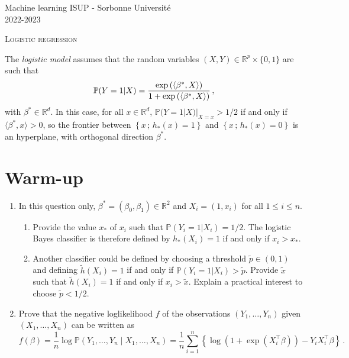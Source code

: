 \documentclass[a4paper,10pt,fleqn]{article}
\newcommand{\eqsp}{\,}
\newcommand{\rset}{\ensuremath{\mathbb{R}}}
\newcommand{\bP}{\mathbb{P}}
\newcommand{\1}{\ensuremath{\mathbbm{1}}}
\begin{document}
\noindent Machine learning \hfill ISUP - Sorbonne Universit\'e \\
 2022-2023

\noindent\hrulefill

\begin{center}
\textsc{Logistic regression}
\end{center}
\hrulefill

\medskip





The \emph{logistic model} assumes that the random variables  $(X,Y)\in \rset^p\times\{0,1\}$ are such that
$$
\bP(Y=1|X)={\exp\left(\langle \beta^*,X\rangle\right)\over 1+\exp\left(\langle \beta^*,X\rangle\right)}\eqsp,
$$
with $\beta^*\in\mathbb{R}^d$. In this case, for all $x\in\rset^d$, $\bP(Y=1|X)|_{X=x}>1/2$ if and only if $\langle \beta^*,x\rangle>0$, so
the frontier between $\left\{x\eqsp;\eqsp h_{*}(x)=1\right\}$ and $\left\{x\eqsp ;\eqsp h_{*}(x)=0\right\}$ is an hyperplane, with orthogonal
direction $\beta^*$. 


\section*{Warm-up}
\begin{enumerate}

	\item In this question only,  $\beta^* = (\beta_0,\beta_1)\in \rset^2$ and $X_i = (1,x_i)$ for all $1\leqslant i \leqslant n$.

\begin{enumerate}
\item Provide the value $x_*$ of $x_i$ such that $\mathbb{P}(Y_i=1 | X_i) = 1/2$. The logistic Bayes classifier is therefore defined by $h_*(X_i) = 1$ if and only if $x_i>x_*$. 
\item Another classifier could be defined by choosing a threshold $\tilde p\in(0,1)$ and defining $\tilde h(X_i) = 1$ if and only if $\mathbb{P}(Y_i=1 | X_i) > \tilde p$.  Provide $\tilde x$ such that $\tilde h(X_i) = 1$ if and only if $x_i>\tilde x$. Explain a practical interest to choose $\tilde p < 1/2$.
\end{enumerate}
	\item 
	Prove that the negative loglikelihood $f$ of the observations $(Y_1,\ldots,Y_n)$ given $(X_1,\ldots,X_n)$ can be written as 
	$$
	f(\beta) =   \frac{1}{n}\log \mathbb{P}\left(Y_1,\ldots,Y_n\middle | X_1,\ldots,X_n\right) = \frac{1}{n}\sum_{i=1}^n \left\{\log(1+\exp(X_{i}^\top\beta))- Y_{i}X_{i}^\top\beta\right\}\eqsp.
	$$
\end{enumerate}
\end{document}
